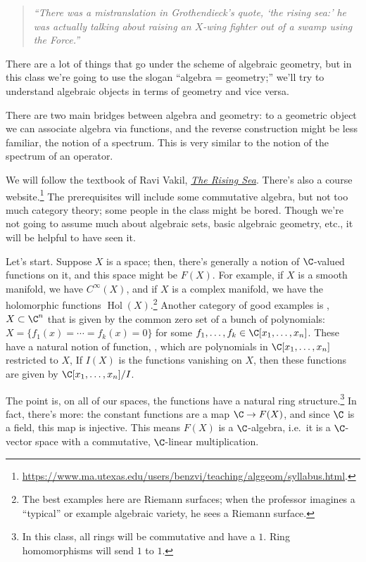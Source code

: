 \begin{quote}\textit{
	``There was a mistranslation in Grothendieck's quote, `the rising sea:' he was actually talking about raising
	an \(X\)-wing fighter out of a swamp using the Force.''
}\end{quote}
There are a lot of things that go under the scheme of algebraic geometry, but in this class we're going to use the
slogan ``algebra = geometry;'' we'll try to understand algebraic objects in terms of geometry and vice versa.

There are two main bridges between algebra and geometry: to a geometric object we can associate algebra via
functions, and the reverse construction might be less familiar, the notion of a spectrum. This is very similar to
the notion of the spectrum of an operator.

We will follow the textbook of Ravi Vakil,
\href{http://math.stanford.edu/~vakil/216blog/FOAGdec2915public.pdf}{\textit{The Rising Sea}}. There's also a
course website.\footnote{\url{https://www.ma.utexas.edu/users/benzvi/teaching/alggeom/syllabus.html}.} The
prerequisites will include some commutative algebra, but not too much category theory; some people in the class
might be bored. Though we're not going to assume much about algebraic sets, basic algebraic geometry, etc., it will
be helpful to have seen it.

Let's start. Suppose \(X\) is a space; then, there's generally a notion of \(\C\)-valued functions on it, and this
space might be \(F(X)\). For example, if \(X\) is a smooth manifold, we have \(C^\infty(X)\), and if \(X\) is a
complex manifold, we have the holomorphic functions \(\operatorname{Hol}(X)\).\footnote{The best examples here are
Riemann surfaces; when the professor imagines a ``typical'' or example algebraic variety, he sees a Riemann
surface.} Another category of good examples is , \(X\subset\C^n\) that is given by the common
zero set of a bunch of polynomials: \(X = \{f_1(x) =\dotsb= f_k(x) = 0\}\) for some
\(f_1,\dots,f_k\in\C[x_1,\dots,x_n]\). These have a natural notion of function, , which
are polynomials in \(\C[x_1,\dots,x_n]\) restricted to \(X\), If \(I(X)\) is the functions vanishing on \(X\), then
these functions are given by \(\C[x_1,\dots,x_n]/I\).

The point is, on all of our spaces, the functions have a natural ring structure.\footnote{In this class, all rings
will be commutative and have a \(1\). Ring homomorphisms will send \(1\) to \(1\).} In fact, there's more: the
constant functions are a map \(\C\to F(X)\), and since \(\C\) is a field, this map is injective. This means
\(F(X)\) is a \(\C\)-algebra, i.e.\ it is a \(\C\)-vector space with a commutative, \(\C\)-linear multiplication.

